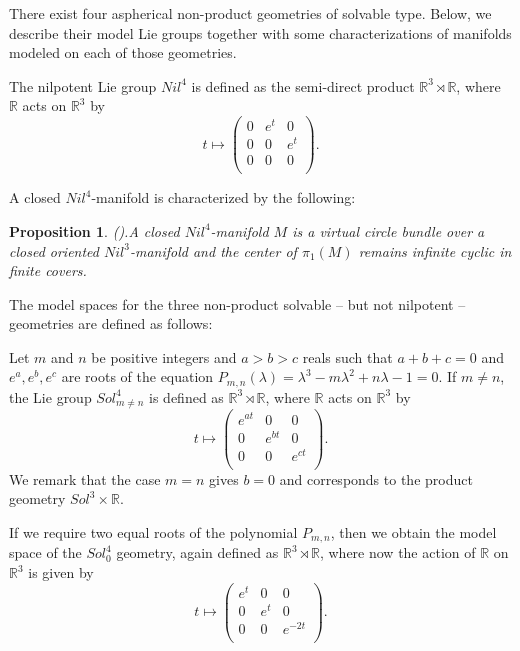 \documentclass[12pt]{amsart}
\newtheorem{prop}[thm]{Proposition}
\theoremstyle{remark}
\begin{document}
\medskip

 There exist four aspherical non-product geometries of solvable type. Below, we describe their
model Lie groups together with some characterizations of manifolds modeled on each of those geometries.

The nilpotent Lie group $Nil^4$ is defined as the semi-direct product ${\mathbb{R}}^3 \rtimes {\mathbb{R}}$, where ${\mathbb{R}}$ acts on ${\mathbb{R}}^3$ by
\[
t \mapsto 
\left(\begin{array}{ccc}
   0 & e^t & 0 \\
   0 & 0 & e^t \\
   0 & 0 & 0   \\
\end{array} \right).
\]

A closed $Nil^4$-manifold is characterized by the following:

\begin{prop}{\normalfont (\cite[Prop. 6.10]{NeoIIPP}).}\label{p:nil4}
A closed $Nil^4$-manifold $M$ is a virtual circle bundle over a closed oriented $Nil^3$-manifold and the center of $\pi_1(M)$ remains infinite cyclic in finite covers.
\end{prop}

The model spaces for the three non-product solvable -- but not nilpotent -- geometries are defined as follows:

Let $m$ and $n$ be positive integers and $a > b > c$ reals such that $a+b+c=0$ and $e^a,e^b,e^c$ are
roots of the equation $P_{m,n}(\lambda)=\lambda^3-m\lambda^2+n\lambda-1=0$. If $m \neq n$, the Lie group $Sol_{m \neq n}^4$ is defined as ${\mathbb{R}}^3 \rtimes
{\mathbb{R}}$, where ${\mathbb{R}}$ acts on ${\mathbb{R}}^3$ by
\[
t \mapsto 
\left(\begin{array}{ccc}
   e^{at} & 0 & 0 \\
   0 & e^{bt} & 0 \\
   0 & 0 & e^{ct} \\
\end{array} \right).
\]
We remark that the case $m=n$ gives $b = 0$ and corresponds to the product geometry $Sol^3 \times {\mathbb{R}}$. 

If we require two equal roots of the polynomial $P_{m,n}$, then we obtain the model space of the $Sol_0^4$ geometry, again defined as ${\mathbb{R}}^3
\rtimes {\mathbb{R}}$, where now the action of ${\mathbb{R}}$ on ${\mathbb{R}}^3$ is given by
\[
t \mapsto 
\left(\begin{array}{ccc}
   e^{t} & 0 & 0 \\
   0 & e^{t} & 0 \\
   0 & 0 & e^{-2t} \\
\end{array} \right).
\]
\end{document}
